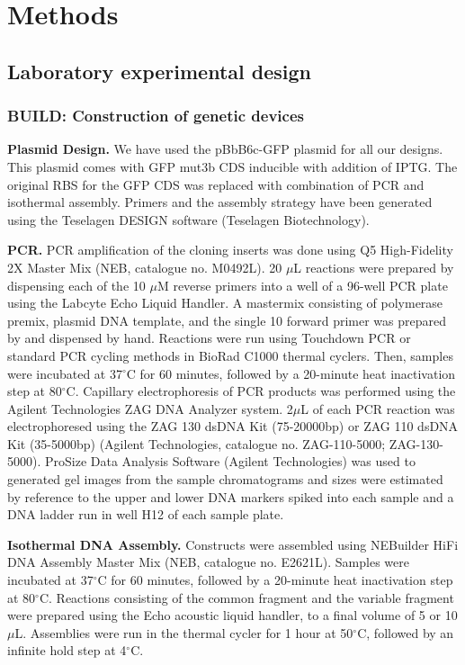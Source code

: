 \section{Methods}

\subsection{Laboratory experimental design}

\subsubsection{BUILD: Construction of genetic devices}

\textbf{Plasmid Design.}
We have used the pBbB6c-GFP plasmid for all our designs.
This plasmid comes with GFP mut3b CDS inducible with addition of IPTG.
The original RBS for the GFP CDS was replaced with combination of PCR and isothermal assembly.
Primers and the assembly strategy have been generated using the Teselagen DESIGN software (Teselagen Biotechnology).

\textbf{PCR.}
PCR amplification of the cloning inserts was done using Q5 High-Fidelity 2X Master Mix (NEB, catalogue no. M0492L).
20 $\mu$L reactions were prepared by dispensing each of the 10 $\mu$M reverse primers into a well of a 96-well PCR plate using the Labcyte Echo Liquid Handler.
A mastermix consisting of polymerase premix, plasmid DNA template, and the single 10 forward primer was prepared by and dispensed by hand. Reactions were run using Touchdown PCR or standard PCR cycling methods in BioRad C1000 thermal cyclers.
Then, samples were incubated at 37$^{\circ}$C for 60 minutes, followed by a 20-minute heat inactivation step at 80$^{\circ}$C.
Capillary electrophoresis of PCR products was performed using the Agilent Technologies ZAG DNA Analyzer system.
2$\mu$L of each PCR reaction was electrophoresed using the ZAG 130 dsDNA Kit (75-20000bp) or ZAG 110 dsDNA Kit (35-5000bp) (Agilent Technologies, catalogue no. ZAG-110-5000; ZAG-130-5000).
ProSize Data Analysis Software (Agilent Technologies) was used to generated gel images from the sample chromatograms and sizes were estimated by reference to the upper and lower DNA markers spiked into each sample and a DNA ladder run in well H12 of each sample plate. 

\textbf{Isothermal DNA Assembly.}
Constructs were assembled using NEBuilder HiFi DNA Assembly Master Mix (NEB, catalogue no. E2621L).
Samples were incubated at 37$^{\circ}$C for 60 minutes, followed by a 20-minute heat inactivation step at 80$^{\circ}$C.
Reactions consisting of the common fragment and the variable fragment were prepared using the Echo acoustic liquid handler, to a final volume of 5 or 10\(\mu\)L.
Assemblies were run in the thermal cycler for 1 hour at 50$^{\circ}$C, followed by an infinite hold step at 4$^{\circ}$C.

